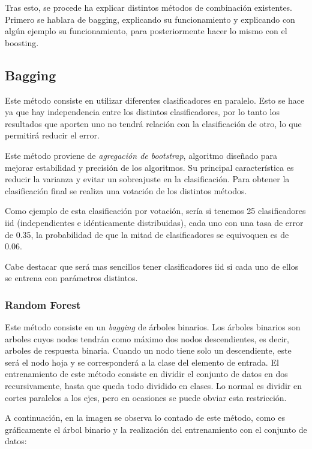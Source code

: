 Tras esto, se procede ha explicar distintos métodos de combinación existentes. Primero se hablara de bagging, explicando su funcionamiento y explicando con algún ejemplo su funcionamiento, para posteriormente hacer lo mismo con el boosting.

\subsection{Bagging}
Este método consiste en utilizar diferentes clasificadores en paralelo. Esto se hace ya que hay independencia entre los distintos clasificadores, por lo tanto los resultados que aporten uno no tendrá relación con la clasificación de otro, lo que permitirá reducir el error. 

Este método proviene de \textit{agregación de bootstrap}, algoritmo diseñado para mejorar estabilidad y precisión de los algoritmos. Su principal característica es reducir la varianza y evitar un sobreajuste en la clasificación. Para obtener la clasificación final se realiza una votación de los distintos métodos.

Como ejemplo de esta clasificación por votación, sería si tenemos 25 clasificadores iid (independientes e idénticamente distribuidas), cada uno con una tasa de error de 0.35, la probabilidad de que la mitad de clasificadores se equivoquen es de 0.06.

Cabe destacar que será mas sencillos tener clasificadores iid si cada uno de ellos se entrena con parámetros distintos.

\subsubsection{Random Forest}
Este método consiste en un \textit{bagging} de árboles binarios. Los árboles binarios son arboles cuyos nodos tendrán como máximo dos nodos descendientes, es decir, arboles de respuesta binaria. Cuando un nodo tiene solo un descendiente, este será el nodo hoja y se corresponderá a la clase del elemento de entrada.
El entrenamiento de este método consiste en dividir el conjunto de datos en dos recursivamente, hasta que queda todo dividido en clases. Lo normal es dividir en cortes paralelos a los ejes, pero en ocasiones se puede obviar esta restricción.

A continuación, en la imagen se observa lo contado de este método, como es gráficamente el árbol binario y la realización del entrenamiento con el conjunto de datos:


